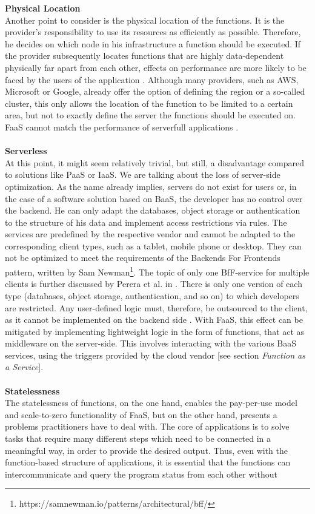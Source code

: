 \documentclass[a4paper,twoside,11pt, pagesize]{scrartcl}
\begin{document}
\begin{spacing}{1.2}
\textbf{Physical Location}\\ Another point to consider is the physical location of the functions. It is the provider's responsibility to use its resources as efficiently as possible. Therefore, he decides on which node in his infrastructure a function should be executed. If the provider subsequently locates functions that are highly data-dependent physically far apart from each other, effects on performance are more likely to be faced by the users of the application \cite{shafiei2020serverless}. Although many providers, such as AWS, Microsoft or Google, already offer the option of defining the region or a so-called cluster, this only allows the location of the function to be limited to a certain area, but not to exactly define the server the functions should be executed on. FaaS cannot match the performance of serverfull applications \cite{shafiei2020serverless}.\\\\ \textbf{Serverless}\\ At this point, it might seem relatively trivial, but still, a disadvantage compared to solutions like PaaS or IaaS. We are talking about the loss of server-side optimization. As the name already implies, servers do not exist for users or, in the case of a software solution based on BaaS, the developer has no control over the backend. He can only adapt the databases, object storage or authentication to the structure of his data and implement access restrictions via rules. The services are predefined by the respective vendor and cannot be adapted to the corresponding client types, such as a tablet, mobile phone or desktop. They can not be optimized to meet the requirements of the \glqq Backends For Frontends\grqq{} pattern, written by Sam Newman\footnote{https://samnewman.io/patterns/architectural/bff/}. The topic of only one BfF-service for multiple clients is further discussed by Perera et al. in \cite{perera2018rule}. There is only one version of each type (databases, object storage, authentication, and so on) to which developers are restricted. Any user-defined logic must, therefore, be outsourced to the client, as it cannot be implemented on the backend side \cite{fowler2018serverless}. With FaaS, this effect can be mitigated by implementing lightweight logic in the form of functions, that act as middleware on the server-side. This involves interacting with the various BaaS services, using the triggers provided by the cloud vendor [see section \textit{Function as a Service}].\\\\ \textbf{Statelessness}\\ The statelessness of functions, on the one hand, enables the pay-per-use model and scale-to-zero functionality of FaaS, but on the other hand, presents a problems practitioners have to deal with. The core of applications is to solve tasks that require many different steps which need to be connected in a meaningful way, in order to provide the desired output. Thus, even with the function-based structure of applications, it is essential that the functions can intercommunicate and query the program status from each other without 
\end{spacing}
\end{document}
